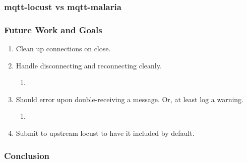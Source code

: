 \documentclass{beamer}
\begin{document}
\begin{frame}
    \frametitle{mqtt-locust vs mqtt-malaria}
\end{frame}

\begin{frame}
    \frametitle{Future Work and Goals}
    \begin{enumerate}
        \item
            Clean up connections on close.
        \item
            Handle disconnecting and reconnecting cleanly.
            \begin{enumerate}
                \item
            \end{enumerate}
        \item
            Should error upon double-receiving a message. Or, at least log a
            warning.
            \begin{enumerate}
                \item
            \end{enumerate}
        \item
            Submit to upstream locust to have it included by default.
    \end{enumerate}
\end{frame}

\begin{frame}
    \frametitle{Conclusion}
\end{frame}
\end{document}
